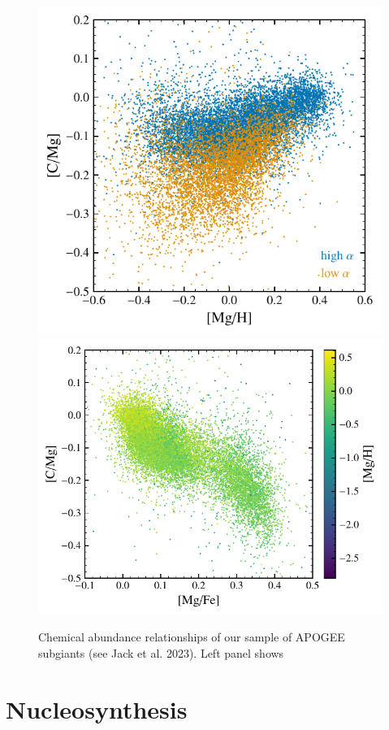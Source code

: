 \documentclass[fleqn,usenatbib]{mnras}
\begin{document}
\begin{figure}
    \centering
    \includegraphics[]{subgiants_mgh.pdf}
    \includegraphics[]{subgiants_mgfe.pdf}
    \caption{Chemical abundance relationships of our sample of APOGEE subgiants (see Jack et al. 2023). Left panel shows }
    \label{fig:subgiants}
\end{figure}
\section{Nucleosynthesis}
\end{document}
